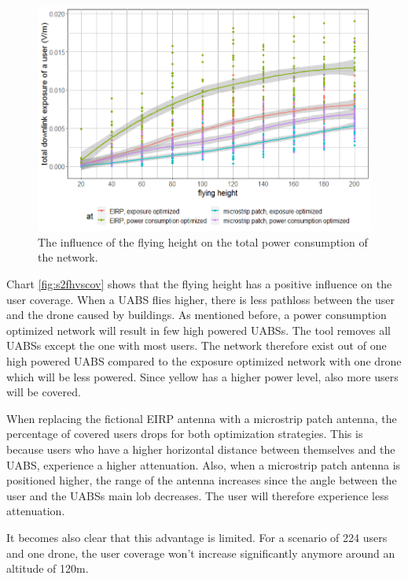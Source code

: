 \begin{figure}[h!]
  \includegraphics[width=\textwidth]{../results/s2/fhvsdl.png}
  \caption{The influence of the flying height on the total power consumption of the network.}
  \label{fig:s2fhvspc}
\end{figure}


Chart  \ref{fig:s2fhvscov} shows that the flying height has a positive influence on the user coverage. 
When a \gls{UABS} flies higher, there is less pathloss between the user and the drone caused by buildings. 
As mentioned before, a power consumption optimized network will result in few high powered \gls{UABS}s. 
The tool removes all \gls{UABS}s except the one with most users. 
The network therefore exist out of one high powered \gls{UABS} compared to the exposure optimized network with one drone which 
will be less powered. Since yellow has a higher power level, also more users will be covered.

When replacing the fictional \gls{EIRP} antenna with a microstrip patch antenna, the percentage of covered users drops for both 
optimization strategies. This is because users who have a higher horizontal distance between themselves and the \gls{UABS}, 
experience a higher attenuation. Also, when a microstrip patch antenna is positioned higher, the range of the antenna increases 
since the angle between the user and the \gls{UABS}s main lob decreases. The user will therefore experience less attenuation.

It becomes also clear that this advantage is limited. For a scenario of 224 users and one drone, the user coverage won’t increase
 significantly anymore around an altitude of 120m.

